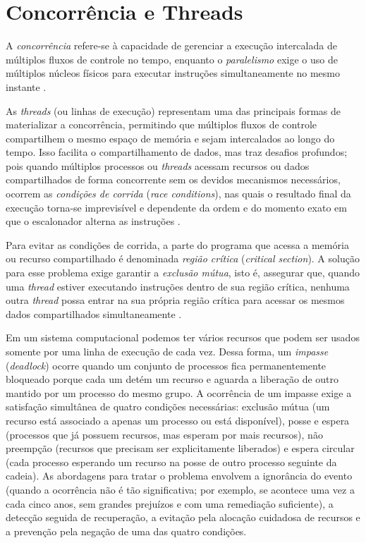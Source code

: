 \documentclass[12pt,a4paper]{article}
\begin{document}
\section{Concorrência e Threads}
A \emph{concorrência} refere-se à capacidade de gerenciar a execução intercalada de múltiplos fluxos de controle no tempo,
enquanto o \emph{paralelismo} exige o uso de múltiplos núcleos físicos para executar
instruções simultaneamente no mesmo instante \parencite[cap.~2]{tanenbaum2016}.

As \textit{threads} (ou linhas de execução) representam uma das principais formas de materializar a concorrência,
permitindo que múltiplos fluxos de controle compartilhem o mesmo espaço de memória e sejam intercalados ao longo do tempo.
Isso facilita o compartilhamento de dados, mas traz desafios profundos;
pois quando múltiplos processos ou \textit{threads} acessam recursos
ou dados compartilhados de forma concorrente sem os devidos mecanismos necessários,
ocorrem as \emph{condições de corrida} (\textit{race conditions}),
nas quais o resultado final da execução torna-se imprevisível
e dependente da ordem e do momento exato em que o escalonador alterna as instruções \parencite[cap.~2]{tanenbaum2016}.

Para evitar as condições de corrida,
a parte do programa que acessa a memória ou recurso compartilhado é denominada \emph{região crítica} (\textit{critical section}).
A solução para esse problema exige garantir a \emph{exclusão mútua}, isto é, assegurar que,
quando uma \textit{thread} estiver executando instruções dentro de sua região crítica,
nenhuma outra \textit{thread} possa entrar na sua própria região crítica
para acessar os mesmos dados compartilhados simultaneamente \parencite[seç.~2.3]{tanenbaum2016}.

Em um sistema computacional podemos ter vários recursos que podem ser usados somente por uma linha de execução de cada vez.
Dessa forma, um \emph{impasse} (\textit{deadlock}) ocorre quando um conjunto de processos fica permanentemente bloqueado
porque cada um detém um recurso e aguarda a liberação de outro mantido por um processo do mesmo grupo.
A ocorrência de um impasse exige a satisfação simultânea de quatro condições necessárias:
exclusão mútua (um recurso está associado a apenas um processo ou está disponível),
posse e espera (processos que já possuem recursos, mas esperam por mais recursos),
não preempção (recursos que precisam ser explicitamente liberados)
e espera circular (cada processo esperando um recurso na posse de outro processo seguinte da cadeia).
As abordagens para tratar o problema envolvem a ignorância do evento
(quando a ocorrência não é tão significativa;
por exemplo, se acontece uma vez a cada cinco anos, sem grandes prejuízos e com uma remediação suficiente),
a detecção seguida de recuperação, a evitação pela alocação cuidadosa de recursos
e a prevenção pela negação de uma das quatro condições.
\end{document}
